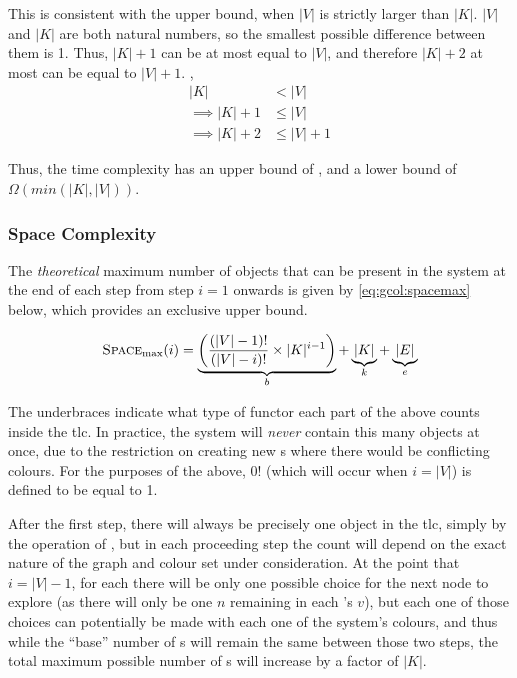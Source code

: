 This is consistent with the upper bound, when \(|V|\) is strictly larger than \(|K|\).  \(|V|\) and \(|K|\) are both natural numbers, so the smallest possible difference between them is 1.  Thus, \(|K| + 1\) can be at most equal to \(|V|\), and therefore \(|K| + 2\) at most can be equal to \(|V| + 1\).  \Ie{},
\begin{align*}
    |K| &< |V|\\
    \implies |K| + 1 &\leq |V|\\
    \implies |K| + 2 &\leq |V| + 1
\end{align*}

Thus, the time complexity has an upper bound of , and a lower bound of \(\Omega(min(|K|, |V|))\).

\subsubsection{Space Complexity}

The \emph{theoretical} maximum number of objects that can be present in the system at the end of each step from step \(i = 1\) onwards is given by \cref{eq:gcol:spacemax} below, which provides an exclusive upper bound.

\begin{equation}\label{eq:gcol:spacemax}
    \textsc{Space}_{\text{max}}(i) = \underbrace{\bigg(\frac{(|V| - 1)!}{(|V| - i)!} \times |K|^{i-1}\bigg)}_{b} + \underbrace{|K|}_{k} + \underbrace{|E|}_{e}
\end{equation}

The underbraces indicate what type of \gls{functor} each part of the above counts inside the \gls{tlc}.  In practice, the system will \emph{never} contain this many objects at once, due to the restriction on creating new \bo{}s where there would be conflicting colours.  For the purposes of the above, \(0!\) (which will occur when \(i = |V|\)) is defined to be equal to 1.

After the first step, there will always be precisely one \bo{} object in the \gls{tlc}, simply by the operation of , but in each proceeding step the count will depend on the exact nature of the graph and colour set under consideration.  At the point that \(i = |V| - 1\), for each \bo{} there will be only one possible choice for the next node to explore (as there will only be one \(n\) remaining in each \bo{}'s \(v\)), but each one of those choices can potentially be made with each one of the system's colours, and thus while the ``base'' number of \bo{}s will remain the same between those two steps, the total maximum possible number of \bo{}s will increase by a factor of \(|K|\).

